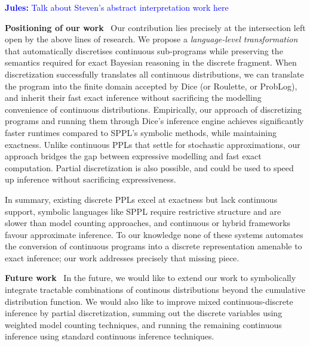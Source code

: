 \documentclass[acmsmall,screen,dvipsnames,x11names,nonacm,anonymous,review]{acmart}
\renewcommand{\paragraph}[1]{\vspace{1em}\noindent\textbf{#1}\ }
\newcommand{\jules}[1]{\textcolor{blue}{\textbf{Jules:} #1}}
\begin{document}
\jules{Talk about Steven's abstract interpretation work here}

\paragraph{Positioning of our work}  
Our contribution lies precisely at the intersection left open by the above lines of research. We propose a \emph{language-level transformation} that automatically discretises continuous sub-programs while preserving the semantics required for exact Bayesian reasoning in the discrete fragment. When discretization successfully translates all continuous distributions, we can translate the program into the finite domain accepted by Dice (or Roulette, or ProbLog), and inherit their fast exact inference without sacrificing the modelling convenience of continuous distributions. 
Empirically, our approach of discretizing programs and running them through Dice's inference engine achieves significantly faster runtimes compared to SPPL's symbolic methods, while maintaining exactness. Unlike continuous PPLs that settle for stochastic approximations, our approach bridges the gap between expressive modelling and fast exact computation. Partial discretization is also possible, and could be used to speed up inference without sacrificing expressiveness.

\medskip  
In summary, existing discrete PPLs excel at exactness but lack continuous support, symbolic languages like SPPL require restrictive structure and are slower than model counting approaches, and continuous or hybrid frameworks favour approximate inference. To our knowledge none of these systems automates the conversion of continuous programs into a discrete representation amenable to exact inference; our work addresses precisely that missing piece.

\paragraph{Future work}
In the future, we would like to extend our work to symbolically integrate tractable combinations of continous distributions beyond the cumulative distribution function.
We would also like to improve mixed continuous-discrete inference by partial discretization, summing out the discrete variables using weighted model counting techniques, and running the remaining continuous inference using standard continuous inference techniques.



\end{document}
